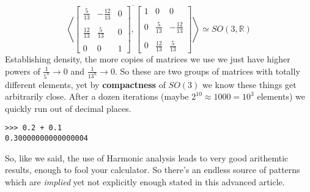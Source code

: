 \documentclass[12pt]{article}
\begin{document}
$$ 
\overline{\left\langle \left[ 
\begin{array}{crc} \frac{5}{13} & -\frac{12}{13} & 0 \\ \\ 
\frac{12}{13} & \frac{5}{13} & 0 \\ \\
0 & 0 & 1 \end{array} \right], 
\left[ 
\begin{array}{ccr} 1 & 0 & 0 \\ \\ 0 & \frac{5}{13} & -\frac{12}{13}  \\ \\ 
0 & \frac{12}{13} & \frac{5}{13}  \end{array} \right] \right\rangle } \simeq SO(3, \mathbb{R})
$$
Establishing density, the more copies of matrices we use we just have higher powers of $\frac{1}{5^n} \to 0$ and $\frac{1}{13^n} \to 0$.  So these are two groups of matrices with totally different elements, yet by \textbf{compactness} of $SO(3)$ we know these things get arbitrarily close.  After a dozen iterations (maybe $2^{10} \approx 1000 = 10^3$ elements) we quickly run out of decimal places.
\begin{verbatim}
>>> 0.2 + 0.1
0.30000000000000004
\end{verbatim}
So, like we said, the use of Harmonic analysis leads to very good arithemtic results, enough to fool your calculator.  So there's an endless source of patterns which are \textit{implied} yet not explicitly enough stated in this advanced article.
\end{document}
